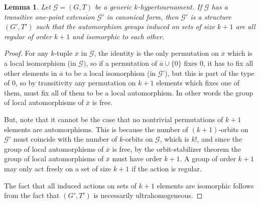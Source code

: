 \documentclass{amsart}
\newtheorem{lemma}[theorem]{Lemma}
\def\graph{\mathcal{G}}
\begin{document}


\begin{lemma}\label{Conditions for Tournament extensions}
    Let $\graph = (G, T)$ be a generic $k$-hypertournament. If $\graph$ has a transitive one-point extension $\graph'$ in canonical form, then $\graph'$ is a structure $(G', T')$ such that the automorphism groups induced on sets of size $k+1$ are all regular of order $k+1$ and isomorphic to each other.
\end{lemma}
\begin{proof}
      
    For any $k$-tuple $\overline{x}$ in $\graph$, the identity is the only permutation on $\overline{x}$ which is a local isomorphism (in $\graph)$, so if a permutation of $\overline{a} \cup \{0\}$ fixes $0$, it has to fix all other elements in $\overline{a}$ to be a local isomorphism (in $\graph$'), but this is part of the type of 0, so by transitivity any permutation on $k+1$ elements which fixes one of them, must fix all of them to be a local automorphism. In other words the group of local automorphisms of $\overline{x}$ is free.

    But, note that it cannot be the case that no nontrivial permutations of $k+1$ elements are automorphisms. This is because the number of $(k+1)$-orbits on $\graph'$ must coincide with the number of $k$-orbits on $\graph$, which is $k!$, and since the group of local automorphisms of $\overline{x}$ is free, by the orbit-stabilizer theorem the group of local automorphisms of $\overline{x}$ must have order $k+1$. A group of order $k+1$ may only act freely on a set of size $k+1$ if the action is regular. 

    The fact that all induced actions on sets of $k+1$ elements are isomorphic follows from the fact that $(G', T')$ is necessarily ultrahomogeneous.
\end{proof}
\end{document}
